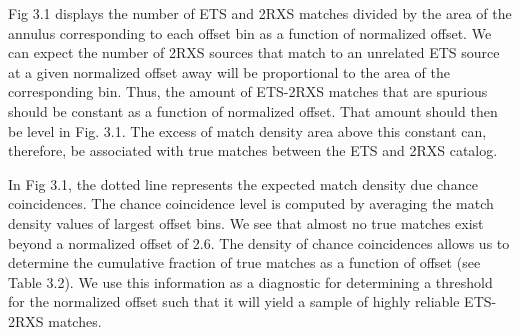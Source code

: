 Fig 3.1 displays the number of ETS and 2RXS matches divided by the area of the annulus corresponding to each offset bin as a function of normalized offset.
We can expect the number of 2RXS sources that match to an unrelated ETS source at a given normalized offset away will be proportional to the area of the corresponding bin. Thus, the amount of ETS-2RXS matches that are spurious should be constant as a function of normalized offset.
That amount should then be level in Fig. 3.1.
The excess of match density area above this constant can, therefore, be associated with true matches between the ETS and 2RXS catalog.

\FloatBarrier

In Fig 3.1, the dotted line represents the expected match density due chance coincidences.
The chance coincidence level is computed by averaging the match density values of largest offset bins.
We see that almost no true matches exist beyond a normalized offset of 2.6. The density of chance coincidences allows us to determine the cumulative fraction of true matches as a function of offset (see Table 3.2).
We use this information as a diagnostic for determining a threshold for the normalized offset such that it will yield a sample of highly reliable ETS-2RXS matches.


\begin{table}[H]
    \centering
    \caption{Breakdown of the match statistics from Fig 3.1 by bin.}
    \label{tab:my_label}
\end{table}

